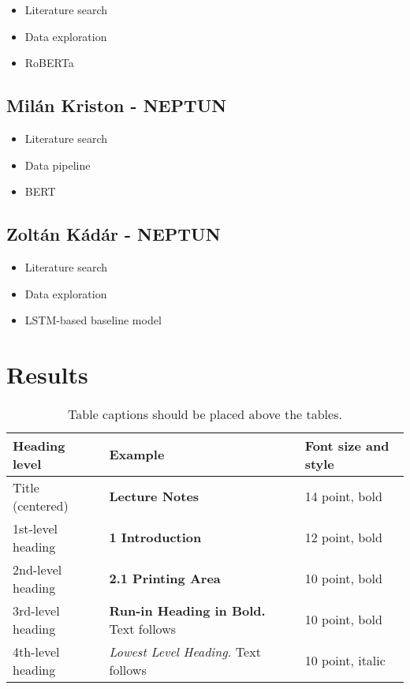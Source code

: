 \documentclass[runningheads]{llncs}
\begin{document}
\begin{itemize}
  \item Literature search
  \item Data exploration
  \item RoBERTa
\end{itemize}

\subsection{Milán Kriston - NEPTUN}

\begin{itemize}
  \item Literature search
  \item Data pipeline
  \item BERT
\end{itemize}

\subsection{Zoltán Kádár - NEPTUN}

\begin{itemize}
  \item Literature search
  \item Data exploration
  \item LSTM-based baseline model
\end{itemize}

\section{Results}


\begin{table}
\caption{Table captions should be placed above the
tables.}\label{tab1}
\begin{tabular}{|l|l|l|}
\hline
Heading level &  Example & Font size and style\\
\hline
Title (centered) &  {\Large\bfseries Lecture Notes} & 14 point, bold\\
1st-level heading &  {\large\bfseries 1 Introduction} & 12 point, bold\\
2nd-level heading & {\bfseries 2.1 Printing Area} & 10 point, bold\\
3rd-level heading & {\bfseries Run-in Heading in Bold.} Text follows & 10 point, bold\\
4th-level heading & {\itshape Lowest Level Heading.} Text follows & 10 point, italic\\
\hline
\end{tabular}
\end{table}



\end{document}

